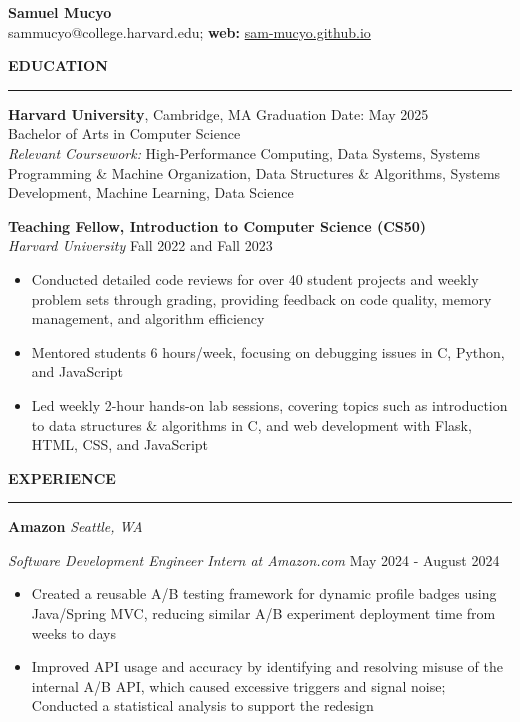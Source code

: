 \documentclass[11pt,a4paper]{article}
\newcommand{\sectionheading}[1]{\vspace{0.2cm}\textbf{\Large #1}\vspace{0.1cm}\hrule\vspace{0.3cm}}
\newcommand{\subheading}[1]{\textbf{#1}}
\newcommand{\daterange}[1]{\hfill{#1}}
\begin{document}
\begin{center}
    \textbf{\LARGE Samuel Mucyo}\\
    \vspace{0.3cm}
    sammucyo@college.harvard.edu; \textbf{web:} \href{https://sam-mucyo.github.io/}{sam-mucyo.github.io} \\
\end{center}


\sectionheading{EDUCATION}
\subheading{Harvard University}, Cambridge, MA \daterange{Graduation Date: May 2025}\\
Bachelor of Arts in Computer Science\\
\textit{Relevant Coursework:} High-Performance Computing, Data Systems, Systems Programming \& Machine Organization, Data Structures \& Algorithms, Systems Development, Machine Learning, Data Science

\subheading{Teaching Fellow, Introduction to Computer Science (CS50)}\\
\textit{Harvard University} \daterange{Fall 2022 and Fall 2023}
\begin{itemize}[leftmargin=*,nosep]
    \item Conducted detailed code reviews for over 40 student projects and weekly problem sets through grading, providing feedback on code quality, memory management, and algorithm efficiency
    \item Mentored students 6 hours/week, focusing on debugging issues in C, Python, and JavaScript
    \item Led weekly 2-hour hands-on lab sessions, covering topics such as introduction to data structures \& algorithms in C, and web development with Flask, HTML, CSS, and JavaScript
\end{itemize}

\sectionheading{EXPERIENCE}
\subheading{Amazon} \hfill \textit{Seattle, WA}

\textit{Software Development Engineer Intern at Amazon.com} \daterange{May 2024 - August 2024}
\begin{itemize}[leftmargin=*,nosep]
    \item Created a reusable A/B testing framework for dynamic profile badges using Java/Spring MVC, reducing similar A/B experiment deployment time from weeks to days
    \item Improved API usage and accuracy by identifying and resolving misuse of the internal A/B API, which caused excessive triggers and signal noise; Conducted a statistical analysis to support the redesign
\end{itemize}
\end{document}
